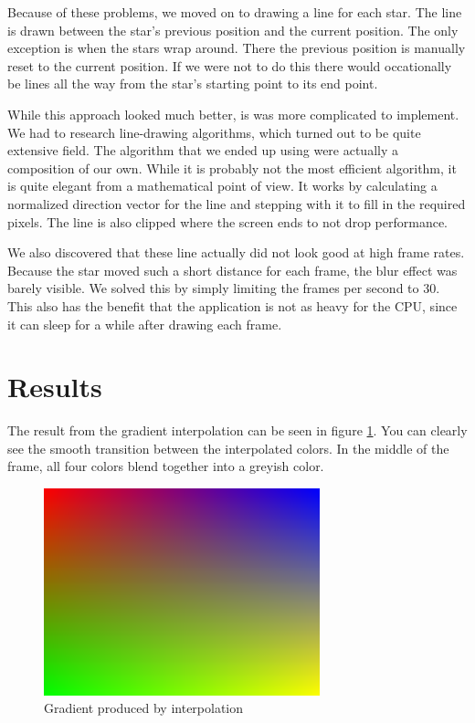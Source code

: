 \documentclass[a4paper]{article}
\begin{document}
Because of these problems, we moved on to drawing a line for each star.
The line is drawn between the star's previous position and the current position.
The only exception is when the stars wrap around.
There the previous position is manually reset to the current position.
If we were not to do this there would occationally be lines all the way from the star's starting point to its end point.

While this approach looked much better, is was more complicated to implement.
We had to research line-drawing algorithms, which turned out to be quite extensive field.
The algorithm that we ended up using were actually a composition of our own.
While it is probably not the most efficient algorithm, it is quite elegant from a mathematical point of view.
It works by calculating a normalized direction vector for the line and stepping with it to fill in the required pixels.
The line is also clipped where the screen ends to not drop performance.

We also discovered that these line actually did not look good at high frame rates.
Because the star moved such a short distance for each frame, the blur effect was barely visible.
We solved this by simply limiting the frames per second to 30.
This also has the benefit that the application is not as heavy for the CPU, since it can sleep for a while after drawing each frame.

\section{Results}
The result from the gradient interpolation can be seen in figure \ref{gradient_fig}.
You can clearly see the smooth transition between the interpolated colors.
In the middle of the frame, all four colors blend together into a greyish color.

\begin{figure}[H]
\begin{center}
\includegraphics[width=8cm]{gradient.png}
\caption{Gradient produced by interpolation}
\label{gradient_fig}
\end{center}
\end{figure}
\end{document}
